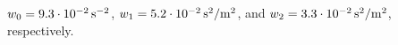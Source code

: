 $w_{0}=\unit[9.3 \cdot 10^{-2}]{s^{-2}}$, $w_{1}=\unit[5.2 \cdot 10^{-2}]{s^2/m^2}$, and $w_{2}=\unit[3.3 \cdot 10^{-2}]{s^2/m^2}$, respectively.